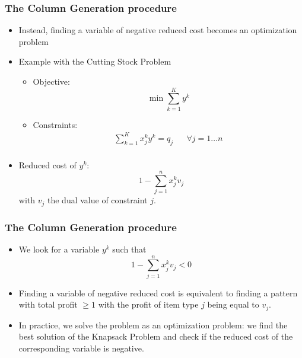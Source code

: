\documentclass[10pt]{beamer}
\begin{document}
\begin{frame}
  \frametitle{The Column Generation procedure}
  \begin{itemize}
    \item Instead, finding a variable of negative reduced cost becomes an optimization problem

    \item Example with the Cutting Stock Problem
      \begin{itemize}
        \item Objective:
          \begin{displaymath}
            \min \sum_{k = 1}^{K} y^k
          \end{displaymath}

        \item Constraints:
          \begin{align*}
            \sum_{k = 1}^{K} x_j^k y^k = q_j && \forall j = 1 \dots n \\
          \end{align*}
      \end{itemize}

    \item Reduced cost of $y^k$:
      \begin{displaymath}
        1 - \sum_{j = 1}^n x_j^k v_j
      \end{displaymath}
      with $v_j$ the dual value of constraint $j$.
  \end{itemize}
\end{frame}

\begin{frame}
  \frametitle{The Column Generation procedure}
  
  \begin{itemize}
    \item We look for a variable $y^k$ such that
      \begin{displaymath}
        1 - \sum_{j = 1}^n x_j^k v_j < 0
      \end{displaymath}
    
    \item Finding a variable of negative reduced cost is equivalent to finding a pattern with total profit $\ge 1$ with the profit of item type $j$ being equal to $v_j$.

    \item In practice, we solve the problem as an optimization problem: we find the best solution of the Knapsack Problem and check if the reduced cost of the corresponding variable is negative.
  \end{itemize}

\end{frame}
\end{document}
